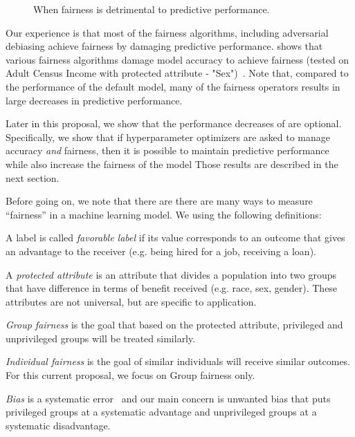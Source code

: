 \begin{figure} 
\pgfplotsset{width=8cm,height=6cm,compat=1.8}
\caption{When fairness is detrimental to predictive performance.}\label{fig:Fairness}
\end{figure}
Our experience is that most of the fairness algorithms, including
adversarial debiasing   achieve fairness by damaging
predictive performance.   shows that various fairness algorithms damage model accuracy to achieve fairness (tested on  Adult Census Income with protected attribute - "Sex")~\cite{IBM}. Note that,
compared to the performance of the default model,
many of the fairness operators results in large decreases in predictive performance.

Later in this proposal, we show that the performance decreases of  are optional.
Specifically, we show that if hyperparameter optimizers are asked to manage accuracy {\em and}
fairness, then it is possible to maintain predictive performance while also increase the fairness of the model
Those results are described in the next section.
 
Before going on, we note that there are there are many ways to measure ``fairness'' in a machine learning model.
We using the following definitions:
\bi
\item
 
 A label is called \textit{favorable label} if its  value corresponds to an outcome that gives an advantage to the receiver (e.g. being hired for a job, receiving a loan).
 \item
A \textit{protected attribute} is an attribute that divides a population into two groups that have difference in terms of benefit received  (e.g. race, sex, gender). These attributes are not universal, but are specific to application.
 \item
\textit{Group fairness} is the goal that based on the protected attribute, privileged and unprivileged groups will be treated similarly. 
 \item
\textit{Individual fairness} is the goal of similar individuals will receive similar outcomes.  For
this current proposal, we focus on  Group fairness only.
 \item
{\em Bias} is a systematic error~\cite{bias_systemetic}
and our main concern is unwanted bias that puts privileged groups at a systematic advantage and unprivileged groups at a systematic disadvantage. 
\ei

